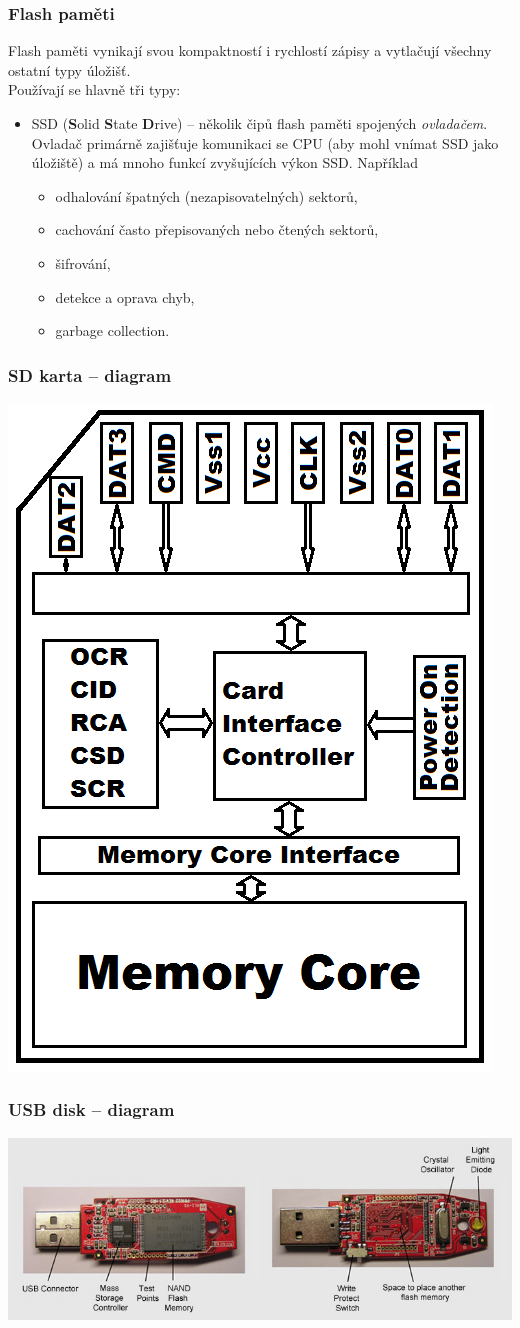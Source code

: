\documentclass[aspectratio=169,11pt,svgnames]{beamer}
\begin{document}
\begin{frame}
 \frametitle{Flash paměti}
 Flash paměti vynikají svou kompaktností i rychlostí zápisy a vytlačují všechny
 ostatní typy úložišť.\\
 Používají se hlavně tři typy:
 \begin{itemize}[label=\textbullet]
  \item SSD (\textbf{S}olid \textbf{S}tate \textbf{D}rive) -- několik čipů flash
   paměti spojených \emph{ovladačem}. Ovladač primárně zajišťuje komunikaci se
   CPU (aby mohl vnímat SSD jako  úložiště) a má mnoho funkcí
   zvyšujících výkon SSD. 
   \pause
   Například
   \begin{itemize}[label=\textemdash]
    \item odhalování špatných (nezapisovatelných) sektorů,
    \item cachování často přepisovaných nebo čtených sektorů,
    \item šifrování,
    \item detekce a oprava chyb,
    \item garbage collection.
   \end{itemize}
 \end{itemize}
\end{frame}

\begin{frame}
 \frametitle{SD karta -- diagram}
 \begin{center}
  \includegraphics[width=.4\textwidth,angle=-90,origin=c]{sd}
 \end{center}
\end{frame}

\begin{frame}
 \frametitle{USB disk -- diagram}
 \begin{center}
  \includegraphics[width=\textwidth]{usb}
 \end{center}
\end{frame}
\end{document}

